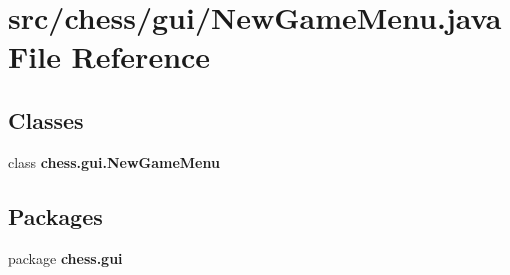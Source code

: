 \section{src/chess/gui/\+New\+Game\+Menu.java File Reference}
\label{_new_game_menu_8java}
\subsection*{Classes}
\begin{DoxyCompactItemize}
\item 
class {\bf chess.\+gui.\+New\+Game\+Menu}
\end{DoxyCompactItemize}
\subsection*{Packages}
\begin{DoxyCompactItemize}
\item 
package {\bf chess.\+gui}
\end{DoxyCompactItemize}
